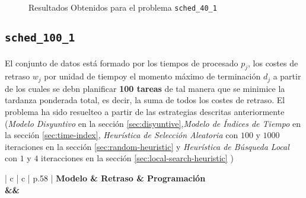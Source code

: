\documentclass[spanish]{article}
\begin{document}
			\begin{figure}[h]
				\begin{center}
				\end{center}
				\caption{Resultados Obtenidos para el problema \texttt{sched\_40\_1}}
				\label{plot:sol-sched_40_1}
			\end{figure}

		\subsection{\texttt{sched\_100\_1}}

			\paragraph{}
			El conjunto de datos está formado por los tiempos de procesado $p_j$, los costes de retraso $w_j$ por unidad de tiempoy el momento máximo de terminación $d_j$ a partir de los cuales se debn planificar \textbf{100 tareas} de tal manera que se minimice la tardanza ponderada total, es decir, la suma de todos los costes de retraso. El problema ha sido resuelteo a partir de las estrategias descritas anteriormente (\emph{Modelo Disyuntivo} en la sección \ref{sec:disyuntive},\emph{Modelo de Índices de Tiempo} en la sección \ref{sec:time-index}, \emph{Heurística de Selección Aleatoria} con $100$ y $1000$ iteraciones en la sección \ref{sec:random-heuristic} y \emph{Heurística de Búsqueda Local} con $1$ y $4$ iteracciones en la sección \ref{sec:local-search-heuristic} )


			\begin{table}[h]
				\centering
				\begin{tabu}{ | c | c | p{.58\linewidth} |}
					\hline
					\bfseries Modelo & \bfseries Retraso & \bfseries Programación
					{\\\hline\model&\delay&\schedule}
					\\\hline
				\end{tabu}
				\caption{Resultados Obtenidos para el problema \texttt{sched\_100\_1}}
				\label{table:sol-sched_100_1}
			\end{table}
\end{document}
